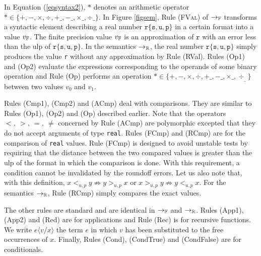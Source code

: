 In Equation (\ref{eqsyntax2}), $\ast$ denotes an arithmetic operator
$\ast\in\{+,-,\times,\div,+\_,-\_,\times\_,\div\_\}$.
In Figure \ref{figsem}, Rule \textsc{(FVal)} of $\rightarrow_{\mathbb{F}}$ transforms a syntactic element 
describing a real number
$\mathtt{r\{s,u,p\} }$ in a certain format into a value $v_{\mathbb{F}}$.
The finite precision value $v_{\mathbb{F}}$ is an approximation of $\mathtt{r}$ with
an error less than the \textsf{ulp} of $\mathtt{r\{s,u,p\} }$.
In the semantics $\rightarrow_{\mathbb{R}}$, the real number $\mathtt{r\{s,u,p\} }$ simply
produces the value \texttt{r} without any approximation by Rule \textsf{(RVal)}.
Rules \textsf{(Op1)} and  \textsf{(Op2)} evaluate the expressions corresponding to the operands
of some binary operation and Rule  \textsf{(Op)} performs an operation $\ast\in\{+,-,\times,\div,+\_,-\_,\times\_,\div_\_\}$
between two values $v_0$ and $v_1$. 

Rules \textsf{(Cmp1)}, \textsf{(Cmp2)} and \textsf{(ACmp)} deal with comparisons.
They are similar to Rules \textsf{(Op1)}, \textsf{(Op2)} and \textsf{(Op)} described earlier.
Note that the operators $<,\ >,\ =,\ \not=$ concerned by Rule \textsf{(ACmp)} are polymorphic
excepted that they do not accept arguments of type \texttt{real}.
Rules \textsf{(FCmp)} and \textsf{(RCmp)} are for the comparison of \texttt{real} values. Rule 
\textsf{(FCmp)} is designed 
to avoid unstable tests by requiring that the distance between the 
two compared values is greater than the \textsf{ulp} of the format in which the comparison is
done. With this requirement, a condition cannot be invalidated by the roundoff errors.
Let us also note  that, with this definition, $x<_{u,p} y \not\Rightarrow y>_{u,p} x$
or $x>_{u,p} y \not\Rightarrow y<_{u,p} x$. For the semantics $\rightarrow_{\mathbb{R}}$, Rule \textsf{(RCmp)}
simply compares the exact values.

The other rules are standard and are identical in $\rightarrow_{\mathbb{F}}$
and $\rightarrow_{\mathbb{R}}$. Rules \textsf{(App1)}, \textsf{(App2) and \textsf{(Red)}}
are for applications and Rule \textsf{(Rec)} is for recursive functions. 
 We write $e\langle v/x\rangle$ the term $e$ in which $v$ has been substituted
to the free occurrences of $x$. Finally, Rules \textsf{(Cond)}, \textsf{(CondTrue)} and \textsf{(CondFalse)} 
are for conditionals.


